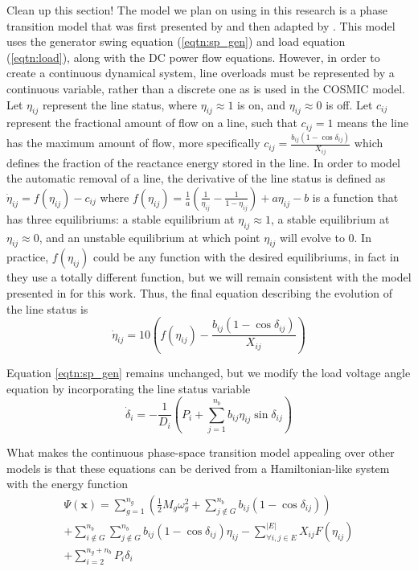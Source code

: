 {\color{red} Clean up this section!}
The model we plan on using in this research is a phase transition model that was first presented by \cite{DeMarco2001} and then adapted by \cite{Yang2017}.  This model uses the generator swing equation (\ref{eqtn:sp_gen}) and load equation (\ref{eqtn:load}), along with the DC power flow equations.  However, in order to create a continuous dynamical system, line overloads must be represented by a continuous variable, rather than a discrete one as is used in the COSMIC model.  Let $\eta_{ij}$ represent the line status, where $\eta_{ij}\approx1$ is on, and $\eta_{ij}\approx0$ is off.  Let $c_{ij}$ represent the fractional amount of flow on a line, such that $c_{ij}=1$ means the line has the maximum amount of flow, more specifically $c_{ij} = \frac{b_{ij}(1-\cos \delta_{ij})}{X_{ij}}$ which defines the fraction of the reactance energy stored in the line.  In order to model the automatic removal of a line, the derivative of the line status is defined as $\dot{\eta}_{ij}=f(\eta_{ij}) - c_{ij}$ where $f(\eta_{ij}) = \frac{1}{a}(\frac{1}{\eta_{ij}}-\frac{1}{1-\eta_{ij}})+a\eta_{ij}-b$ is a function that has three equilibriums: a stable equilibrium at $\eta_{ij}\approx 1$, a stable equilibrium at $\eta_{ij} \approx 0$, and an unstable equilibrium at which point $\eta_{ij}$ will evolve to $0$.  In practice, $f(\eta_{ij})$ could be any function with the desired equilibriums, in fact in \cite{DeMarco2001} they use a totally different function, but we will remain consistent with the model presented in \cite{Yang2017} for this work.  Thus, the final equation describing the evolution of the line status is
\begin{equation}
\label{eqtn:line_status}
\dot{\eta}_{ij} = 10(f(\eta_{ij})-	\frac{b_{ij}(1-\cos \delta_{ij})}{X_{ij}})
\end{equation}


Equation \ref{eqtn:sp_gen} remains unchanged, but we modify the load voltage angle equation by incorporating the line status variable
\begin{equation}
\label{eqtn:alt_load}
\dot{\delta}_i = -\frac{1}{D_i}(P_i +\sum\limits_{j=1}^{n_b} b_{ij}\eta_{ij} \sin \delta_{ij})	
\end{equation}


What makes the continuous phase-space transition model appealing over other models   is that these equations can be derived from a Hamiltonian-like system with the energy function 
\begin{equation}
\begin{split}
\Psi(\textbf{x}) = \sum\limits_{g=1}^{n_g}(\frac{1}{2}M_g\omega_g^2+\sum\limits_{j \notin G}^{n_b} b_{ij} (1-\cos\delta_{ij})) \\
 + \sum\limits_{i \notin G}^{n_b} \sum\limits_{j \notin G}^{n_b} b_{ij}(1-\cos\delta_{ij})\eta_{ij} - \sum\limits_{\forall i,j \in E}^{|E|} X_{ij}F(\eta_{ij})\\
       +        \sum\limits_{i=2}^{n_g+n_b}P_i\delta_i\\
 \end{split}
\end{equation}

